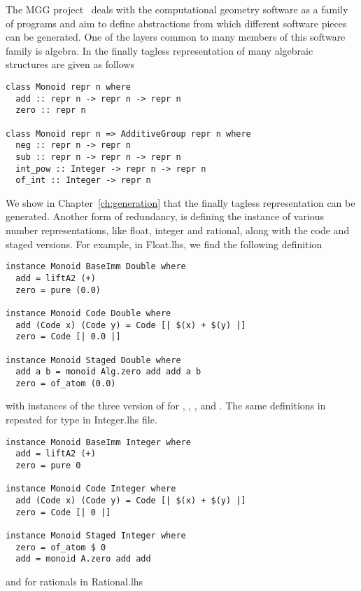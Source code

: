 The MGG project~\cite{carette2011generative} deals with the computational geometry software as a family of programs and aim to define abstractions from which different software pieces can be generated. One of the layers common to many members of this software family is algebra. In  the finally tagless representation of many algebraic structures are given as follows 
\begin{verbatim}
class Monoid repr n where
  add :: repr n -> repr n -> repr n
  zero :: repr n

class Monoid repr n => AdditiveGroup repr n where
  neg :: repr n -> repr n
  sub :: repr n -> repr n -> repr n
  int_pow :: Integer -> repr n -> repr n
  of_int :: Integer -> repr n
\end{verbatim}
We show in Chapter~\ref{ch:generation} that the finally tagless representation can be generated. Another form of redundancy, is defining the  instance of various number representations, like float, integer and rational, along with the code and staged versions. For example, in Float.lhs, we find the following definition 
\begin{verbatim}
instance Monoid BaseImm Double where
  add = liftA2 (+)
  zero = pure (0.0)

instance Monoid Code Double where
  add (Code x) (Code y) = Code [| $(x) + $(y) |]
  zero = Code [| 0.0 |]

instance Monoid Staged Double where
  add a b = monoid Alg.zero add add a b
  zero = of_atom (0.0)
\end{verbatim}
with instances of the three version of  for , , , and . The same definitions in repeated for  type in Integer.lhs file. 
\begin{verbatim}
instance Monoid BaseImm Integer where
  add = liftA2 (+)
  zero = pure 0

instance Monoid Code Integer where
  add (Code x) (Code y) = Code [| $(x) + $(y) |]
  zero = Code [| 0 |]

instance Monoid Staged Integer where
  zero = of_atom $ 0
  add = monoid A.zero add add
\end{verbatim}
and for rationals in Rational.lhs


